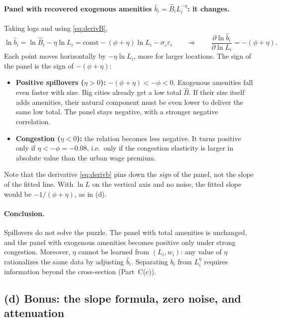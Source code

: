 \documentclass[11pt,a4paper]{article}
\begin{document}
\paragraph{Panel with recovered exogenous amenities $\hat b_i = \hat B_i L_i^{-\eta}$: it changes.}
Taking logs and using \eqref{eq:derivB},
\begin{equation}
    \ln \hat b_i = \ln \hat B_i - \eta \ln L_i = \text{const} - (\phi + \eta)\ln L_i - \sigma_\varepsilon\varepsilon_i
    \qquad\Longrightarrow\qquad
    \frac{\partial \ln \hat b_i}{\partial \ln L_i} = -(\phi + \eta) .
    \label{eq:derivb}
\end{equation}
Each point moves horizontally by $-\eta \ln L_i$, more for larger locations. The sign of the panel is the sign of $-(\phi+\eta)$:
\begin{itemize}[leftmargin=1.5em]
    \item \textbf{Positive spillovers ($\eta > 0$):} $-(\phi+\eta) < -\phi < 0$. Exogenous amenities fall even faster with size. Big cities already get a low total $\hat B$. If their size itself adds amenities, their natural component must be even lower to deliver the same low total. The panel stays negative, with a stronger negative correlation.
    \item \textbf{Congestion ($\eta < 0$):} the relation becomes less negative. It turns positive only if $\eta < -\phi = -0.08$, i.e.\ only if the congestion elasticity is larger in absolute value than the urban wage premium.
\end{itemize}
Note that the derivative \eqref{eq:derivb} pins down the \emph{sign} of the panel, not the slope of the fitted line. With $\ln L$ on the vertical axis and no noise, the fitted slope would be $-1/(\phi+\eta)$, as in (d).

\paragraph{Conclusion.} Spillovers do not solve the puzzle. The panel with total amenities is unchanged, and the panel with exogenous amenities becomes positive only under strong congestion. Moreover, $\eta$ cannot be learned from $(L_i, w_i)$: any value of $\eta$ rationalizes the same data by adjusting $\hat b_i$. Separating $b_i$ from $L_i^\eta$ requires information beyond the cross-section (Part~C(c)).

\subsection*{(d) Bonus: the slope formula, zero noise, and attenuation}
\end{document}
